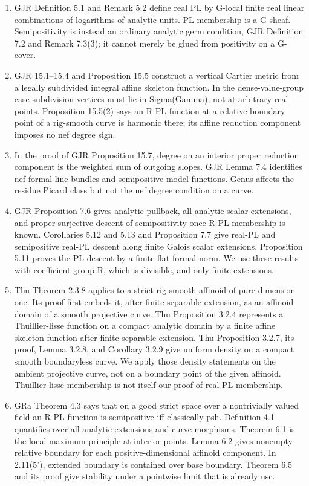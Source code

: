\documentclass[11pt]{article}
\begin{document}
\begin{enumerate}
\item GJR Definition 5.1 and Remark 5.2 define real PL by G-local finite real linear combinations of logarithms of analytic units. PL membership is a G-sheaf. Semipositivity is instead an ordinary analytic germ condition, GJR Definition 7.2 and Remark 7.3(3); it cannot merely be glued from positivity on a G-cover.
\item GJR 15.1–15.4 and Proposition 15.5 construct a vertical Cartier metric from a legally subdivided integral affine skeleton function. In the dense-value-group case subdivision vertices must lie in Sigma(Gamma), not at arbitrary real points. Proposition 15.5(2) says an R-PL function at a relative-boundary point of a rig-smooth curve is harmonic there; its affine reduction component imposes no nef degree sign.
\item In the proof of GJR Proposition 15.7, degree on an interior proper reduction component is the weighted sum of outgoing slopes. GJR Lemma 7.4 identifies nef formal line bundles and semipositive model functions. Genus affects the residue Picard class but not the nef degree condition on a curve.
\item GJR Proposition 7.6 gives analytic pullback, all analytic scalar extensions, and proper-surjective descent of semipositivity once R-PL membership is known. Corollaries 5.12 and 5.13 and Proposition 7.7 give real-PL and semipositive real-PL descent along finite Galois scalar extensions. Proposition 5.11 proves the PL descent by a finite-flat formal norm. We use these results with coefficient group R, which is divisible, and only finite extensions.
\item Thu Theorem 2.3.8 applies to a strict rig-smooth affinoid of pure dimension one. Its proof first embeds it, after finite separable extension, as an affinoid domain of a smooth projective curve. Thu Proposition 3.2.4 represents a Thuillier-lisse function on a compact analytic domain by a finite affine skeleton function after finite separable extension. Thu Proposition 3.2.7, its proof, Lemma 3.2.8, and Corollary 3.2.9 give uniform density on a compact smooth boundaryless curve. We apply those density statements on the ambient projective curve, not on a boundary point of the given affinoid. Thuillier-lisse membership is not itself our proof of real-PL membership.
\item GRa Theorem 4.3 says that on a good strict space over a nontrivially valued field an R-PL function is semipositive iff classically psh. Definition 4.1 quantifies over all analytic extensions and curve morphisms. Theorem 6.1 is the local maximum principle at interior points. Lemma 6.2 gives nonempty relative boundary for each positive-dimensional affinoid component. In 2.11(5'), extended boundary is contained over base boundary. Theorem 6.5 and its proof give stability under a pointwise limit that is already usc.

\end{enumerate}
\end{document}
